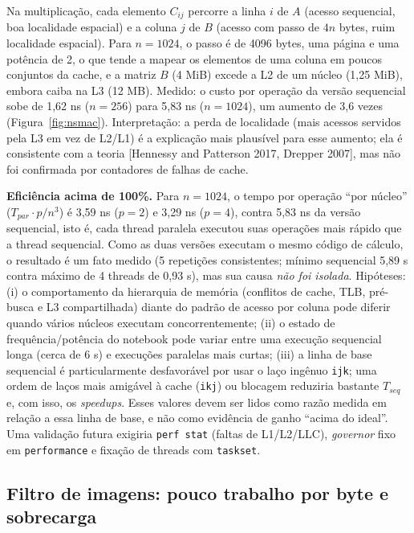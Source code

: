 \documentclass[12pt,a4paper]{article}
\newcommand{\Tseq}{$T_{seq}$}
\begin{document}
Na multiplicação, cada elemento $C_{ij}$ percorre a linha $i$ de $A$ (acesso sequencial, boa localidade espacial) e a coluna $j$ de $B$ (acesso com passo de $4n$ bytes, ruim localidade espacial). Para $n=1024$, o passo é de 4096 bytes, uma página e uma potência de 2, o que tende a mapear os elementos de uma coluna em poucos conjuntos da cache, e a matriz $B$ (4 MiB) excede a L2 de um núcleo (1,25 MiB), embora caiba na L3 (12 MB). Medido: o custo por operação da versão sequencial sobe de 1,62 ns ($n=256$) para 5,83 ns ($n=1024$), um aumento de 3,6 vezes (Figura~\ref{fig:nsmac}). Interpretação: a perda de localidade (mais acessos servidos pela L3 em vez de L2/L1) é a explicação mais plausível para esse aumento; ela é consistente com a teoria [Hennessy and Patterson 2017, Drepper 2007], mas não foi confirmada por contadores de falhas de cache.

\textbf{Eficiência acima de 100\%.} Para $n=1024$, o tempo por operação ``por núcleo'' ($T_{par}\cdot p/n^3$) é 3,59 ns ($p=2$) e 3,29 ns ($p=4$), contra 5,83 ns da versão sequencial, isto é, cada thread paralela executou suas operações mais rápido que a thread sequencial. Como as duas versões executam o mesmo código de cálculo, o resultado é um fato medido (5 repetições consistentes; mínimo sequencial 5,89 s contra máximo de 4 threads de 0,93 s), mas sua causa \emph{não foi isolada}. Hipóteses: (i) o comportamento da hierarquia de memória (conflitos de cache, TLB, pré-busca e L3 compartilhada) diante do padrão de acesso por coluna pode diferir quando vários núcleos executam concorrentemente; (ii) o estado de frequência/potência do notebook pode variar entre uma execução sequencial longa (cerca de 6 s) e execuções paralelas mais curtas; (iii) a linha de base sequencial é particularmente desfavorável por usar o laço ingênuo \texttt{ijk}; uma ordem de laços mais amigável à cache (\texttt{ikj}) ou blocagem reduziria bastante \Tseq{} e, com isso, os \emph{speedups}. Esses valores devem ser lidos como razão medida em relação a essa linha de base, e não como evidência de ganho ``acima do ideal''. Uma validação futura exigiria \texttt{perf stat} (faltas de L1/L2/LLC), \emph{governor} fixo em \texttt{performance} e fixação de threads com \texttt{taskset}.

\subsection{Filtro de imagens: pouco trabalho por byte e sobrecarga}
\end{document}
